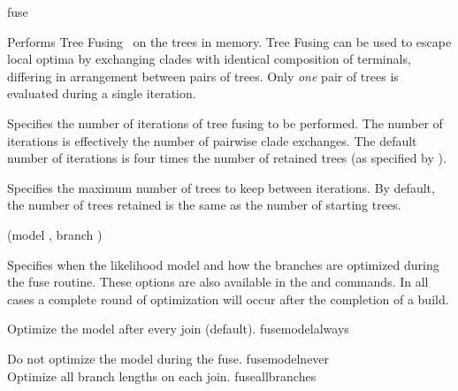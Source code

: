 \begin{command}{fuse}{}


    \begin{poydescription}
        Performs Tree Fusing~\cite{goloboff1999} on the trees in memory.  Tree
        Fusing  can be used to escape local optima by exchanging clades with
        identical composition of terminals, differing in arrangement between pairs
        of trees. Only \emph{one} pair of trees is evaluated during a single iteration.
    \end{poydescription}

    \begin{arguments}
            {Specifies the number of iterations of tree fusing to be performed. The
            number of iterations is effectively the number of pairwise clade exchanges. 
            The default number of iterations is four times the number of retained
            trees (as specified by ).}
            {}

            {Specifies the maximum number of trees to keep between iterations.
            By default, the number of trees retained is the same as the number
            of starting trees.}
            {}
                  
         {(model \optional {\poylident}, branch \optional {\poylident})}
            {Specifies when the likelihood model and how the branches are
            optimized during the fuse routine. These options are also available
            in the  and  commands. In all
            cases a complete round of optimization will occur after the
            completion of a build.

            \begin{description}

                    {Optimize the model after every join (default).}
                    {fusemodelalways}
                    
                    {Do not optimize the model during the fuse.}
                    {fusemodelnever}
\\
                    {Optimize all branch lengths on each join.}
                    {fuseallbranches}


\end{description}}
\end{arguments}
\end{command}
